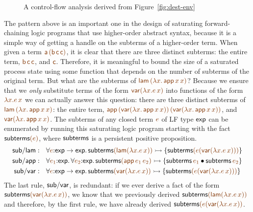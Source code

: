 \begin{figure}[t]
\caption{A control-flow analysis derived from Figure~\ref{fig:dest-env}}
\label{fig:dest-cfa-1}
\end{figure}

The pattern above is an important one in the design of saturating
forward-chaining logic programs that use higher-order abstract syntax,
because it is a simple way of getting a handle on the subterms of a
higher-order term. When given a term $\lf{{\sf a}\,({\sf b}\,{\sf c}\,{\sf
  c})}$, it is clear that there are three distinct subterms: the entire
term, $\lf{{\sf b}\,{\sf c}\,{\sf c}}$, and $\lf{{\sf c}}$. Therefore, it is
meaningful to bound the size of a saturated process state using some
function that depends on the number of subterms of the original
term. But what are the subterms of $\lf{{\sf lam}\,(\lambda x.\,{\sf
  app}\,x\,x)}$?  Because we ensure that we {\it only} substitute terms
of the form $\lf{{\sf var}(\lambda x.e\,x)}$ into functions of the form
$\lf{\lambda x.e\,x}$ we can actually answer this question: there are three
distinct subterms of $\lf{{\sf lam}\,(\lambda x.\,{\sf app}\,x\,x)}$: the
entire term, $\lf{{\sf app}\,({\sf var}(\lambda x.\,{\sf
  app}\,x\,x))\,({\sf var}(\lambda x.\,{\sf app}\,x\,x))}$, and $\lf{{\sf
  var}(\lambda x.\,{\sf app}\,x\,x)}$.  The subterms of any closed term
$\lf{e}$ of LF type ${\sf exp}$ can be enumerated by running this
saturating logic program starting with the fact ${\sf subterms}\lf{(e)}$,
where ${\sf subterms}$ is a persistent positive proposition.
\begin{align*}
{\sf sub/lam} &: ~~
  \forall \lf{e}{:}{\sf exp} \rightarrow {\sf exp}.\,
    {\sf subterms}\lf{({\sf lam}(\lambda x.e\,x))} \lefti
      \{ {\sf subterms}\lf{(e({\sf var}(\lambda x.e\,x)))} \}
\\
{\sf sub/app} &: ~~
  \forall \lf{e_1}{:}{\sf exp}.\, \forall \lf{e_2}{:}{\sf exp}.\,
    {\sf subterms}\lf{({\sf app}\,e_1\,e_2)} \lefti
      \{ {\sf subterms}\,\lf{e_1} \fuse {\sf subterms}\,\lf{e_2} \}
\\
{\sf sub/var} &: ~~ 
  \forall \lf{e}{:}{\sf exp} \rightarrow {\sf exp}.\,
    {\sf subterms}\lf{({\sf var}(\lambda x.e\,x))} \lefti
      \{ {\sf subterms}\lf{(e({\sf var}(\lambda x.e\,x)))} \}
\end{align*}
The last rule, ${\sf sub/var}$, is redundant: if we ever derive a fact
of the form ${\sf subterms}\lf{({\sf var}(\lambda x.e\,x))}$, we know that
we previously derived ${\sf subterms}\lf{({\sf lam}(\lambda x.e\,x))}$ and
therefore, by the first rule, we have already derived ${\sf
  subterms}\lf{(e({\sf var}(\lambda x.e\,x))}$.



